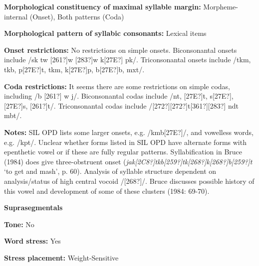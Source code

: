 \begin{styleBody}
\textbf{Morphological constituency of maximal syllable margin:} Morpheme-internal (Onset), Both patterns (Coda)
\end{styleBody}

\begin{styleBody}
\textbf{Morphological pattern of syllabic consonants:} Lexical items
\end{styleBody}

\begin{styleBody}
\textbf{Onset restrictions:} No restrictions on simple onsets. Biconsonantal onsets include /sk tw [261?]w [283?]w k[27E?] pk/. Triconsonantal onsets include /tkm, tkb, p[27E?]t, tkm, k[27E?]p, b[27E?]b, mxt/.
\end{styleBody}

\begin{styleBody}
\textbf{Coda restrictions:} It seems there are some restrictions on simple codas, including /b [261?] w j/. Biconsonantal codas include /nt, [27E?]t, s[27E?], [27E?]s, [261?]t/. Triconsonantal codas include /[272?][272?]t[361?][283?] ndt mbt/.
\end{styleBody}

\begin{styleBody}
\textbf{Notes:} SIL OPD lists some larger onsets, e.g. /kmb[27E?]/, and vowelless words, e.g. /kpt/. Unclear whether forms listed in SIL OPD have alternate forms with epenthetic vowel or if these are fully regular patterns. Syllabification in Bruce (1984) does give three-obstruent onset (\textit{jak[2C8?]tkb[259?]tk[268?]k[268?]b[259?]t} ‘to get and mash’, p. 60). Analysis of syllable structure dependent on analysis/status of high central vocoid /[268?]/. Bruce discusses possible history of this vowel and development of some of these clusters (1984: 69-70).
\end{styleBody}

\begin{styleBody}
\textbf{Suprasegmentals}
\end{styleBody}

\begin{styleBody}
\textbf{Tone:} No
\end{styleBody}

\begin{styleBody}
\textbf{Word stress:} Yes
\end{styleBody}

\begin{styleBody}
\textbf{Stress placement:} Weight-Sensitive
\end{styleBody}

